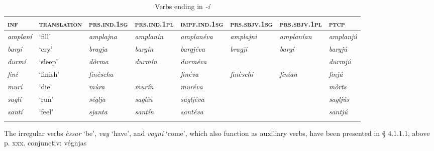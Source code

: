 \begin{sidewaystable} 
	\caption{Verbs ending in \textit{-í}}

	\begin{tabularx}{\textwidth}{llllllll} 
		\lsptoprule
		\textsc{\textbf{inf}} & \textsc{\textbf{translation}} & \textsc{\textbf{prs.ind.1sg}} & \textsc{\textbf{prs.ind.1pl}} & \textsc{\textbf{impf.ind.1sg}} & \textsc{\textbf{prs.sbjv.1sg}} & \textsc{\textbf{prs.sbjv.1pl}} & \textsc{\textbf{ptcp}}\\
		\midrule
		\textit{amplaní} & `fill' & \textit{amplajna} & \textit{amplanín} & \textit{amplanéva} & \textit{amplajni} & \textit{amplanían} & \textit{amplanjú}\\
		\textit{bargí} & `cry' & \textit{bragja}  & \textit{bargín} & \textit{bargjéva} & \textit{bragji} & \textit{bargí} & \textit{bargjú}\\
		\textit{durmí} & `sleep' & \textit{dòrma} & \textit{durmín} & \textit{durméva} & & & \textit{durmjú}\\
		\textit{finí} & `finish' & \textit{finèscha} & & \textit{finéva} & \textit{finèschi} & \textit{finían} & \textit{finjú}\\
		\textit{murí} & `die' & \textit{mùra} & \textit{murín} & \textit{muréva} & & & \textit{mòrts}\\
		\textit{saglí} & `run' & \textit{séglja} & \textit{saglín} & \textit{sagljéva} & & & \textit{sagljús}\\
		\textit{santí} & `feel' & \textit{sjanta} & \textit{santín} & \textit{santéva} & & & \textit{santjú}\\
				\lspbottomrule
	\end{tabularx} 
\end{sidewaystable}



The irregular verbs \textit{èssar} `be', \textit{vay} `have', and \textit{vagní} `come',  which also function as auxiliary verbs, have been presented in § 4.1.1.1, above p. xxx. conjunctiv: végnjas



